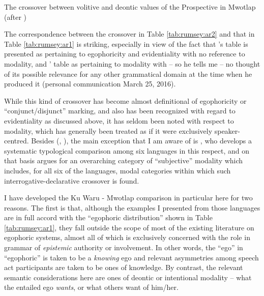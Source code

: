 \documentclass[output=paper]{langsci/langscibook}
\begin{document}
\begin{table}
\missingfigure{~}
\caption{The crossover between volitive and deontic values of the Prospective in Mwotlap (after \citealt[228]{Francois2003})}
\label{tab:rumsey:ar2}
\end{table}

The correspondence between the crossover in Table \ref{tab:rumsey:ar2} and that in Table \ref{tab:rumsey:ar1} is striking, especially in view of the fact that \citeauthor{SanRoqueSchieffelin2018}’s table is presented as pertaining to egophoricity and evidentiality with no reference to modality, and \citeauthor{Francois2003}’ table as pertaining to modality with – so he tells me – no thought of its possible relevance for any other grammatical domain at the time when he produced it (personal communication March 25, 2016). 

While this kind of crossover has become almost definitional of egophoricity or “conjunct/disjunct” marking, and also has been recognized with regard to evidentiality as discussed above, it has seldom been noted with respect to modality, which has generally been treated as if it were exclusively speaker-centred. Besides \citeauthor{Francois2003} (\citeyear{Francois2003}, \citeyear{Francois2004}), the main exception that I am aware of is \cite{Lehmann2012}, who develops a systematic typological comparison among six languages in this respect, and on that basis argues for an overarching category of “subjective” modality which includes, for all six of the languages, modal categories within which such interrogative-declarative crossover is found.

I have developed the Ku Waru - Mwotlap comparison in particular here for two reasons.  The first is that, although the examples I presented from those languages are in full accord with the “egophoric distribution” shown in Table \ref{tab:rumsey:ar1}, they fall outside the scope of most of the existing literature on egophoric systems, almost all of which is exclusively concerned with the role in grammar of \textit{epistemic} authority or involvement. In other words, the “ego” in “egophoric” is taken to be a \textit{knowing} ego and relevant asymmetries among speech act participants are taken to be ones of knowledge. By contrast, the relevant semantic considerations here are ones of deontic or intentional modality – what the entailed ego \textit{wants}, or what others want of him/her. 
\end{document}
